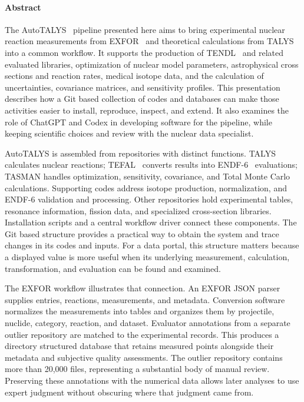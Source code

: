 \paragraph{Abstract}
The AutoTALYS~\cite{autotalys} pipeline presented here aims to bring experimental nuclear reaction 
measurements from EXFOR~\cite{EXFOR} and theoretical calculations from TALYS~\cite{Koning2023TALYS} into a common workflow. 
It supports the production of TENDL~\cite{TENDL} and related evaluated libraries, optimization of nuclear model parameters, 
astrophysical cross sections and reaction rates, medical isotope data, and the calculation of uncertainties, 
covariance matrices, and sensitivity profiles. 
This presentation describes how a Git based collection of codes and databases can make those activities easier to 
install, reproduce, inspect, and extend. It also examines the role of ChatGPT and Codex in developing software for 
the pipeline, while keeping scientific choices and review with the nuclear data specialist.

AutoTALYS is assembled from repositories with distinct functions. 
TALYS calculates nuclear reactions; TEFAL~\cite{tefal} converts results into ENDF-6~\cite{ENDF6FormatsManual2023} evaluations; 
TASMAN handles optimization, sensitivity, covariance, and Total Monte Carlo calculations. 
Supporting codes address isotope production, normalization, and ENDF-6 validation and processing. 
Other repositories hold experimental tables, resonance information, fission data, and specialized cross-section libraries. 
Installation scripts and a central workflow driver connect these components. 
The Git based structure provides a practical way to obtain the system and trace changes in its codes and inputs. 
For a data portal, this structure matters because a displayed value is more useful when its underlying measurement, 
calculation, transformation, and evaluation can be found and examined.

The EXFOR workflow illustrates that connection. An EXFOR JSON parser~\cite{EXFORParser} supplies entries, reactions, measurements, 
and metadata. Conversion software normalizes the measurements into tables and organizes them by projectile, nuclide, 
category, reaction, and dataset. Evaluator annotations from a separate outlier repository are matched to the 
experimental records. This produces a directory structured database that retains measured points alongside 
their metadata and subjective quality assessments. The outlier repository contains more than 20,000 files, 
representing a substantial body of manual review. Preserving these annotations with the numerical data allows 
later analyses to use expert judgment without obscuring where that judgment came from.

